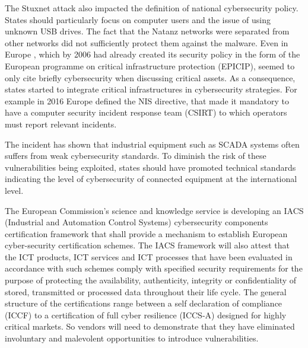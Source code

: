 \documentclass[12pt]{article}
\begin{document}
The Stuxnet attack also impacted the definition of national cybersecurity policy.
States should particularly focus on computer users and the issue of using unknown USB drives.
The fact that the Natanz networks were separated from other networks did not sufficiently protect them against the malware. 
Even in Europe , which by 2006 had already created its security policy  in the form of the European programme on critical infrastructure protection (EPICIP), seemed to only cite briefly cybersecurity when discussing critical assets.
As a consequence, states started to integrate critical infrastructures in cybersecurity strategies.
For example in 2016 Europe defined the NIS directive, that made it mandatory to have a computer security incident response team (CSIRT) to which operators must report relevant incidents. 

The incident has shown that industrial equipment such as SCADA systems often suffers from weak cybersecurity standards. To diminish the risk of these vulnerabilities being exploited, states should have promoted technical standards indicating the level of cybersecurity of connected equipment at the international level.

The European Commission’s science and knowledge service is developing an IACS (Industrial and Automation Control Systems) cybersecurity components certification framework  that shall provide a mechanism to establish European cyber-security certification schemes. The IACS framework will also attest that the ICT products, ICT services and ICT processes that have been evaluated in accordance with such schemes comply with specified security requirements for the purpose of protecting the availability, authenticity, integrity or confidentiality of stored, transmitted or processed data throughout their life cycle. The general structure of  the certifications range between a self declaration of compliance (ICCF) to a certification of full cyber resilience (ICCS-A) designed for highly critical markets. So vendors will need to demonstrate that they have eliminated involuntary and malevolent opportunities to introduce vulnerabilities.
\end{document}
